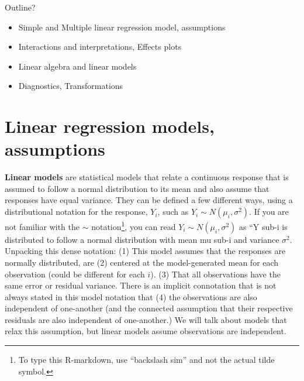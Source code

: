 \documentclass[
]{book}
\begin{document}
Outline?

\begin{itemize}
\item
  Simple and Multiple linear regression model, assumptions
\item
  Interactions and interpretations, Effects plots
\item
  Linear algebra and linear models
\item
  Diagnostics, Transformations
\end{itemize}

\hypertarget{section2-1}{%
\section{Linear regression models, assumptions}\label{section2-1}}

\textbf{Linear models} are statistical models that relate a continuous response that is assumed to follow a normal distribution to its mean and also assume that responses have equal variance. They can be defined a few different ways, using a distributional notation for the response, \(Y_i\), such as \(Y_i \sim N(\mu_i,\sigma^2)\). If you are not familiar with the \(\sim\) notation\footnote{To type this R-markdown, use ``backslash sim'' and not the actual tilde symbol.}, you can read \(Y_i \sim N(\mu_i,\sigma^2)\) as ``Y sub-i is distributed to follow a normal distribution with mean mu sub-i and variance \(\sigma^2\). Unpacking this dense notation: (1) This model assumes that the responses are normally distributed, are (2) centered at the model-generated mean for each observation (could be different for each \(i\)). (3) That all observations have the same error or residual variance. There is an implicit connotation that is not always stated in this model notation that (4) the observations are also independent of one-another (and the connected assumption that their respective residuals are also independent of one-another.) We will talk about models that relax this assumption, but linear models assume observations are independent.
\end{document}
